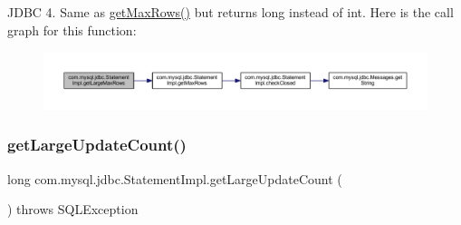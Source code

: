 J\+D\+BC 4. Same as \mbox{\hyperlink{classcom_1_1mysql_1_1jdbc_1_1_statement_impl_a5961bd894f79a6b3e2dedc7726527aab}{get\+Max\+Rows()}} but returns long instead of int. Here is the call graph for this function\+:
\nopagebreak
\begin{figure}[H]
\begin{center}
\leavevmode
\includegraphics[width=350pt]{classcom_1_1mysql_1_1jdbc_1_1_statement_impl_a389a39b21dfb359636a9124ae91d6b86_cgraph}
\end{center}
\end{figure}
\mbox{\label{classcom_1_1mysql_1_1jdbc_1_1_statement_impl_a49c1971a757125e970b073a7b7295a14}} 
\subsubsection{\texorpdfstring{get\+Large\+Update\+Count()}{getLargeUpdateCount()}}
{\footnotesize\ttfamily long com.\+mysql.\+jdbc.\+Statement\+Impl.\+get\+Large\+Update\+Count (\begin{DoxyParamCaption}{ }\end{DoxyParamCaption}) throws S\+Q\+L\+Exception}

